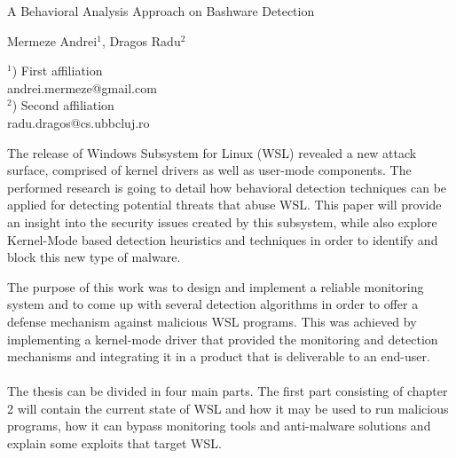 \documentclass[a4paper]{article}
\begin{document}
    
    \Large
     \begin{center}
        A Behavioral Analysis Approach on Bashware Detection\\ 
    
    \hspace{10pt}
    
    \large
    Mermeze Andrei$^1$, Dragos Radu$^2$ \\
    
    \hspace{10pt}
    
    \small  
    $^1$) First affiliation\\
    andrei.mermeze@gmail.com\\
    $^2$) Second affiliation\\
    radu.dragos@cs.ubbcluj.ro
    \end{center}
    
    \hspace{10pt}
    
    \normalsize

    The release of Windows Subsystem for Linux (WSL) revealed a new attack surface, comprised of kernel drivers as well as user-mode components. The
    performed research is going to detail how behavioral detection techniques can be applied for detecting potential threats that abuse
    WSL. This paper will provide an insight into the security issues created by this subsystem, while also explore Kernel-Mode based detection
    heuristics and techniques in order to identify and block this new type of malware.

    The purpose of this work was to design and implement a reliable monitoring system and to come up with several detection algorithms in order
    to offer a defense mechanism against malicious WSL programs. This was achieved by implementing a kernel-mode driver that provided the
    monitoring and detection mechanisms and integrating it in a product that is deliverable to an end-user. 

    \paragraph{}
    The thesis can be divided in four main parts. The first part consisting of chapter 2 will contain the current state of WSL and how it may
    be used to run malicious programs, how it can bypass monitoring tools and anti-malware solutions and explain some exploits that target WSL.
\end{document}
